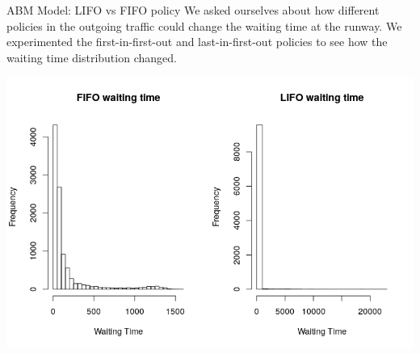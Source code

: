 \documentclass{beamer}
\begin{document}
\begin{frame}{ABM Model: LIFO vs FIFO policy}
We asked ourselves about how different policies in the outgoing traffic could change the waiting time at the runway. We experimented the first-in-first-out and last-in-first-out policies to see how the waiting time distribution changed.

		\centering
\includegraphics[scale=0.4]{FIFO-LIFO.png}


\end{frame}
\end{document}
